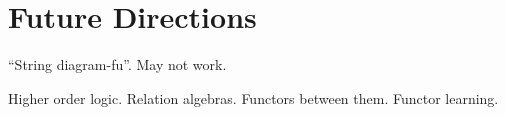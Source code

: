 \chapter{Future Directions}\label{chap:conclusions}

``String diagram-fu''.  May not work.

Higher order logic.  Relation algebras.  Functors between them.  Functor learning.

